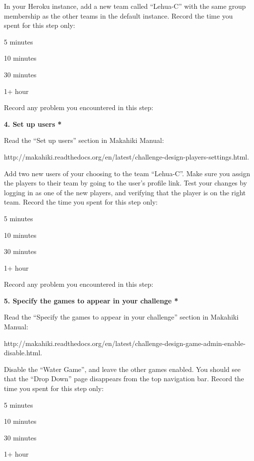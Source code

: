 In your Heroku instance, add a new team called ``Lehua-C'' with the same group membership as the other teams in the default instance. Record the time you spent for this step only:

\begin{radiobutton}
\item 5 minutes
\item  10 minutes
\item  30 minutes
\item  1+ hour
\end{radiobutton}


Record any problem you encountered in this step: \underline{\hspace{4cm}}

{\bf 4. Set up users *}

Read the ``Set up users'' section in Makahiki Manual:

http://makahiki.readthedocs.org/en/latest/challenge-design-players-settings.html. 

Add two new users of your choosing to the team ``Lehua-C''. Make sure you assign the players to their team by going to the user's profile link. Test your changes by logging in as one of the new players, and verifying that the player is on the right team. Record the time you spent for this step only:

\begin{radiobutton}
\item 5 minutes
\item  10 minutes
\item  30 minutes
\item  1+ hour
\end{radiobutton}


Record any problem you encountered in this step: \underline{\hspace{4cm}}

{\bf 5. Specify the games to appear in your challenge *}

Read the ``Specify the games to appear in your challenge'' section in Makahiki Manual:

http://makahiki.readthedocs.org/en/latest/challenge-design-game-admin-enable-disable.html. 

Disable the ``Water Game'', and leave the other games enabled. You should see that the ``Drop Down'' page disappears from the top navigation bar. Record the time you spent for this step only:

\begin{radiobutton}
\item 5 minutes
\item  10 minutes
\item  30 minutes
\item  1+ hour
\end{radiobutton}


